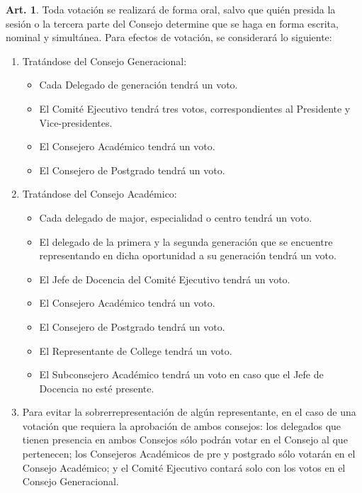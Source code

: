 \documentclass[letterpaper,11pt]{article}
\theoremstyle{definition}%
\newtheorem{art}{Art.} %
\begin{document}
\begin{art}\label{votacioncesConsejo}
	Toda votación se realizará de forma oral, salvo que quién presida la sesión o la tercera parte del Consejo determine que se haga en forma escrita, nominal y simultánea. Para efectos de votación, se considerará lo siguiente:
	\begin{enumerate}
		\item Tratándose del Consejo Generacional:
		      \begin{itemize}
			      \item Cada Delegado de generación tendrá un voto.
			      \item El Comité Ejecutivo tendrá tres votos, correspondientes al Presidente y Vice-presidentes.
			      \item El Consejero Académico tendrá un voto.
			      \item El Consejero de Postgrado tendrá un voto.
		      \end{itemize}
		\item Tratándose del Consejo Académico:
		      \begin{itemize}
			      \item Cada delegado de major, especialidad o centro tendrá un voto.
			      \item El delegado de la primera y la segunda generación que se encuentre representando en dicha oportunidad a su generación tendrá un voto.
			      \item El Jefe de Docencia del Comité Ejecutivo tendrá un voto.
			      \item El Consejero Académico tendrá un voto.
			      \item El Consejero de Postgrado tendrá un voto.
			      \item El Representante de College tendrá un voto.
			      \item El Subconsejero Académico tendrá un voto en caso que el Jefe de Docencia no esté presente.
		      \end{itemize}
		\item Para evitar la sobrerrepresentación de algún representante, en el caso de una votación que requiera la aprobación de ambos consejos: los delegados que tienen presencia en ambos Consejos sólo podrán votar en el Consejo al que pertenecen; los Consejeros Académicos de pre y postgrado sólo votarán en el Consejo Académico; y el Comité Ejecutivo contará solo con los votos en el Consejo Generacional.
	\end{enumerate}
\end{art}
\end{document}
